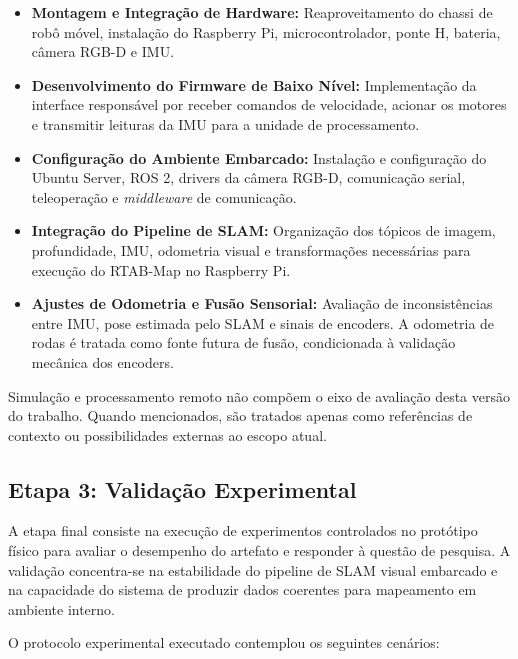 \begin{itemize}
    \item \textbf{Montagem e Integração de Hardware:} Reaproveitamento do chassi de robô móvel, instalação do Raspberry Pi, microcontrolador, ponte H, bateria, câmera RGB-D e IMU.

    \item \textbf{Desenvolvimento do Firmware de Baixo Nível:} Implementação da interface responsável por receber comandos de velocidade, acionar os motores e transmitir leituras da IMU para a unidade de processamento.
    
    \item \textbf{Configuração do Ambiente Embarcado:} Instalação e configuração do Ubuntu Server, ROS 2, drivers da câmera RGB-D, comunicação serial, teleoperação e \textit{middleware} de comunicação.

    \item \textbf{Integração do Pipeline de SLAM:} Organização dos tópicos de imagem, profundidade, IMU, odometria visual e transformações necessárias para execução do RTAB-Map no Raspberry Pi.
    
    \item \textbf{Ajustes de Odometria e Fusão Sensorial:} Avaliação de inconsistências entre IMU, pose estimada pelo SLAM e sinais de encoders. A odometria de rodas é tratada como fonte futura de fusão, condicionada à validação mecânica dos encoders.
\end{itemize}

Simulação e processamento remoto não compõem o eixo de avaliação desta versão do trabalho. Quando mencionados, são tratados apenas como referências de contexto ou possibilidades externas ao escopo atual.

\subsection{Etapa 3: Validação Experimental}
\label{ssec:etapa3_validacao}

A etapa final consiste na execução de experimentos controlados no protótipo físico para avaliar o desempenho do artefato e responder à questão de pesquisa. A validação concentra-se na estabilidade do pipeline de SLAM visual embarcado e na capacidade do sistema de produzir dados coerentes para mapeamento em ambiente interno.

O protocolo experimental executado contemplou os seguintes cenários:


